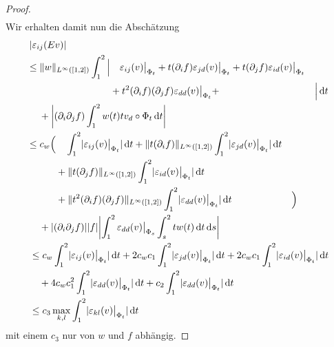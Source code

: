 \documentclass{scrartcl}
\def\e{\varepsilon}
\newcommand{\dif}[1]{\,\mathrm{d} #1}
\newcommand{\norm}[1]{\lVert #1 \rVert}
\DeclarePairedDelimiter{\abs}{|}{|}
\begin{document}
\begin{proof}
\begin{align*}
	\end{align*}
	Wir erhalten damit nun die Abschätzung 
	\begin{align*}
		&\abs{\e_{ij}(Ev)} \\
		&\begin{aligned}\leq \norm{w}_{L^\infty([1,2])}\int_1^2\Big|&\quad\e_{ij}(v)\big\vert_{\Phi_t}+t(\partial_if)\e_{jd}(v)\big\vert_{\Phi_t}+t(\partial_jf)\e_{id}(v)\big\vert_{\Phi_t}& \\
		&+t^2(\partial_if)(\partial_jf)\e_{dd}(v)\big\vert_{\Phi_t}+&\Big|\dif t
		\end{aligned} \\
		&\quad+\abs*{(\partial_{i}\partial_jf)\int_1^2w(t)tv_d\circ\Phi_t\dif t} \\
		&\begin{aligned}\leq c_w\Big(&\quad\int_1^2\abs{\e_{ij}(v)\big\vert_{\Phi_t}}\dif t+\norm{t(\partial_if)}_{L^\infty([1,2])}\int_1^2\abs{\e_{jd}(v)\big\vert_{\Phi_t}}\dif t & \\
		&+\norm{t(\partial_jf)}_{L^\infty([1,2])}\int_1^2\abs{\e_{id}(v)\big\vert_{\Phi_t}}\dif t & \\
		&+\norm{t^2(\partial_if)(\partial_jf)}_{L^\infty([1,2])}\int_1^2\abs{\e_{dd}(v)\big\vert_{\Phi_t}}\dif t&\Big )
		\end{aligned} \\
		&\quad+\abs*{(\partial_{i}\partial_jf)}\abs{f}\abs*{ \int_1^2\e_{dd}(v)\big\vert_{\Phi_s}\int_s^2tw(t)\dif t\dif s} \\
		&\leq c_w\int_1^2\abs{\e_{ij}(v)\big\vert_{\Phi_t}}\dif t
		+2c_wc_1\int_1^2\abs{\e_{jd}(v)\big\vert_{\Phi_t}}\dif t
		+ 2c_wc_1\int_1^2\abs{\e_{id}(v)\big\vert_{\Phi_t}}\dif t \\
		&\quad+ 4c_wc_1^2\int_1^2\abs{\e_{dd}(v)\big\vert_{\Phi_t}}\dif t
		+ c_2\int_1^2\abs{\e_{dd}(v)\big\vert_{\Phi_t}}\dif t \\
		&\leq c_3\max_{k,l}\int_1^2\abs{\e_{kl}(v)\big\vert_{\Phi_t}}\dif t
	\end{align*}
	mit einem $c_3$ nur von $w$ und $f$ abhängig.
	

\end{proof}
\end{document}
